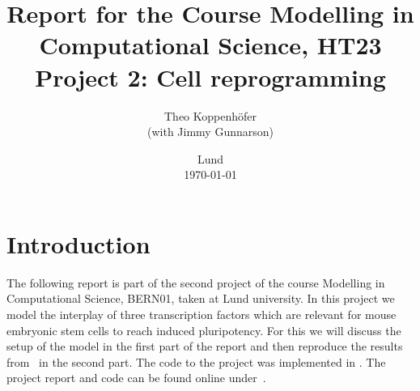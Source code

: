 




\title{ Report for the Course Modelling in Computational Science, HT23 \\[1ex]
	  \large Project 2: Cell reprogramming}
\author{Theo Koppenhöfer \\[1ex] (with Jimmy Gunnarson)}
\date{Lund \\[1ex] \today}



\usepackage{pythonhighlight}
\usepackage{pgfplots}
\graphicspath{{../Plots/}}


\newcommand{\Nover}{N_\text{over}}
\newcommand{\Oover}{O_\text{over}}
\newcommand{\Tover}{T_\text{over}}
\newcommand{\Ntotal}{\text{N}}
\newcommand{\Ototal}{\text{O}}
\newcommand{\Ttotal}{\text{T}}
\newcommand{\NT}{\text{N-T}}
\newcommand{\LIF}{\text{LIF}}






\maketitle

\section{Introduction}
The following report is part of the second project of the course Modelling in Computational Science, BERN01, taken at Lund university.
In this project we model the interplay of three transcription factors which are relevant for mouse embryonic stem cells to reach induced
pluripotency.
For this we will discuss the setup of the model in the first part of the report and then reproduce the results from~\cite{Olariu2016} in the second part.
The code to the project was implemented in .
The project report and code can be found online under~\cite{repository}.

